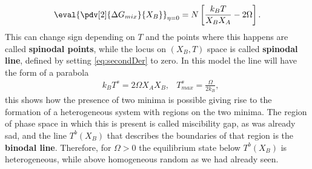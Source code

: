 {    \begin{equation}
        \label{eq:secondDer}
        \eval{\pdv[2]{\Delta G_{mix}}{X_B}}_{\eta=0} = N\left[\frac{k_B T}{X_BX_A} - 2\Omega\right].
    \end{equation}
    This can change sign depending on $T$ and the points where this happens are called \textbf{spinodal points}, while the locus on $(X_B, T)$ space is called \textbf{spinodal line}, defined by setting \eqref{eq:secondDer} to zero. In this model the line will have the form of a parabola
    \begin{align}
        &k_BT^s = 2\Omega X_AX_B, &T^s_{max} = \frac{\Omega}{2k_B},
    \end{align}
    this shows how the presence of two minima is possible giving rise to the formation of a heterogeneous system with regions on the two minima. The region of phase space in which this is present is called miscibility gap, as was already sad, and the line $T^b(X_B)$ that describes the boundaries of that region is the \textbf{binodal line}. Therefore, for $\Omega > 0$ the equilibrium state below $T^b(X_B)$ is heterogeneous, while above homogeneous random as we had already seen.
}
